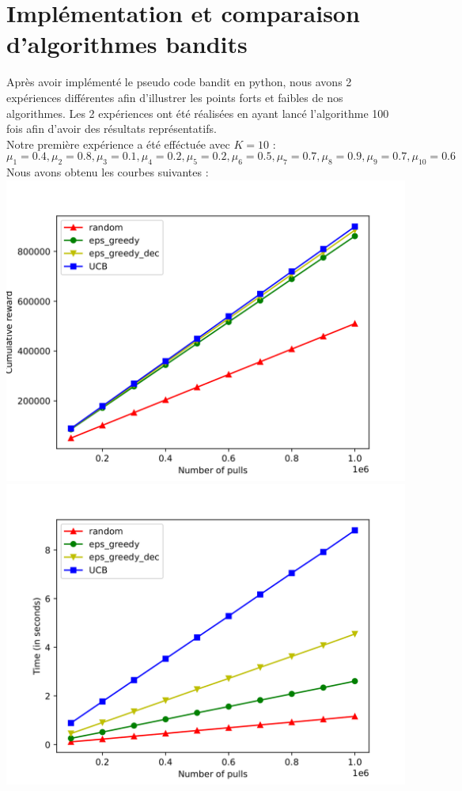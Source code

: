 \documentclass[a4paper, 12pt]{article}
\begin{document}
\section{Implémentation et comparaison d'algorithmes bandits}
Après avoir implémenté le pseudo code bandit en python, nous avons 2 expériences différentes afin d'illustrer les points forts et faibles de nos algorithmes. Les 2 expériences ont été réalisées en ayant lancé l'algorithme 100 fois afin d'avoir des résultats représentatifs.
\\Notre première expérience a été efféctuée avec $K = 10$ : 
\[\mu_1=0.4,\mu_2=0.8,\mu_3=0.1,\mu_4=0.2,\mu_5=0.2,\mu_6=0.5,\mu_7=0.7,\mu_8=0.9,\mu_9=0.7,\mu_{10}=0.6\]
Nous avons obtenu les courbes suivantes :\\
\includegraphics[scale=0.19]{reward_mu_rand.png}
\includegraphics[scale=0.19]{time_mu_rand.png}\\
\end{document}
